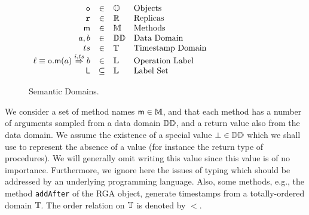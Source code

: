 \begin{figure}
  \centering
  \(
  \begin{array}[t]{rcll}
    \mathtt{o} & \in  & \mathbb{O} & \text{Objects} \\
    \mathtt{r} & \in & \mathbb{R} & \text{Replicas} \\
    \mathsf{m} & \in & \mathbb{M} & \text{Methods}\\
    a, b & \in & \mathbb{DD} & \text{Data Domain} \\
    ts & \in & \mathbb{T} & \text{Timestamp Domain} \\
    \ell \equiv {{\ensuremath{\mathtt{o}}.\ensuremath{\mathsf{m}}}}(a) \overset{i,ts}{\Rightarrow} b & \in & \mathbb{L} & \text{Operation Label} \\
    \mathsf{L} & \subseteq & \mathbb{L} & \text{Label Set}\\
  \end{array}
  \)
  \caption{Semantic Domains.}
  \label{fig:sem-dom}
\end{figure}


We consider a set of method names $\mathsf{m} \in \mathbb{M}$, and that
each method has a number of arguments sampled from a data domain
$\mathbb{DD}$, and a return value also from the data domain.
%
We assume the existence of a special value $\bot \in \mathbb{DD}$
which we shall use to represent the absence of a value (for instance
the return type of procedures).
%
We will generally omit writing this value since this value is of no
importance.
%
Furthermore, we ignore here the issues of typing which should be
addressed by an underlying programming language.
Also, some methods, e.g., the method {\tt addAfter} of the RGA object, generate timestamps from a
totally-ordered domain $\mathbb{T}$. The order relation on $\mathbb{T}$ is denoted by $<$.

